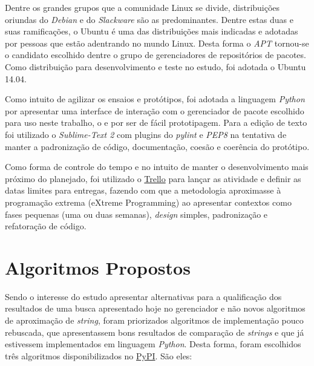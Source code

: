 Dentre os grandes grupos que a comunidade Linux se divide, distribuições oriundas do \textit{Debian} e do \textit{Slackware} são as predominantes. Dentre estas duas e suas ramificações, o Ubuntu é uma das distribuições mais indicadas e adotadas por pessoas que estão adentrando no mundo Linux. Desta forma o \textit{APT} tornou-se o candidato escolhido dentre o grupo de gerenciadores de repositórios de pacotes. Como distribuição para desenvolvimento e teste no estudo, foi adotada o Ubuntu 14.04. 

Como intuito de agilizar os ensaios e protótipos, foi adotada a linguagem \textit{Python} por apresentar uma interface de interação com o gerenciador de pacote escolhido para uso neste trabalho, o  e por ser de fácil prototipagem. Para a edição de texto foi utilizado o \textit{Sublime-Text 2} com plugins do \textit{pylint} e \textit{PEP8} na tentativa de manter a padronização de código, documentação, coesão e coerência do protótipo.

Como forma de controle do tempo e no intuito de manter o desenvolvimento mais próximo do planejado, foi utilizado o \href{https://trello.com}{Trello} para lançar as atividade e definir as datas limites para entregas, fazendo com que a metodologia aproximasse à programação extrema (eXtreme Programming) ao apresentar contextos como fases pequenas (uma ou duas semanas), \textit{design} simples, padronização e refatoração de código.





\section{Algoritmos Propostos} %
\label{sec:algoritmos_propostos}

Sendo o interesse do estudo apresentar alternativas para a qualificação dos resultados de uma busca apresentado hoje no gerenciador e não novos algoritmos de aproximação de \textit{string}, foram priorizados algoritmos de implementação pouco rebuscada, que apresentassem bons resultados de comparação de \textit{strings} e que já estivessem implementados em linguagem \textit{Python}. Desta forma, foram escolhidos três algoritmos disponibilizados no \href{https://pypi.python.org/}{PyPI}. São eles:

